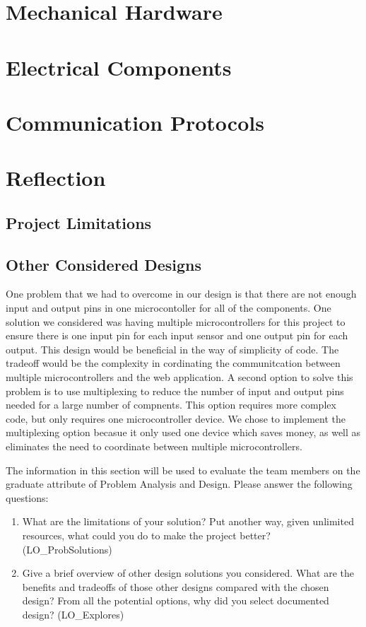 \documentclass[12pt, titlepage]{article}
\begin{document}

\section{Mechanical Hardware}

\section{Electrical Components}

\section{Communication Protocols}

\section{Reflection}

\subsection*{Project Limitations}

\subsection*{Other Considered Designs}
One problem that we had to overcome in our design is that there are not enough input and output pins in one microcontoller for all of the components.
One solution we considered was having multiple microcontrollers for this project to ensure there is one input pin for each input sensor and one output pin for each output.
This design would be beneficial in the way of simplicity of code. The tradeoff would be the complexity in cordinating the communitcation between multiple microcontrollers and the 
web application. A second option to solve this problem is to use multiplexing to reduce the number of input and output pins needed for a large number of compnents. 
This option requires more complex code, but only requires one microcontroller device. We chose to implement the multiplexing option becasue it only used one device which saves money,
as well as eliminates the need to coordinate between multiple microcontrollers. 

The information in this section will be used to evaluate the team members on the
graduate attribute of Problem Analysis and Design.  Please answer the following questions:

\begin{enumerate}
  \item What are the limitations of your solution?  Put another way, given
  unlimited resources, what could you do to make the project better? (LO\_ProbSolutions)
  \item Give a brief overview of other design solutions you considered.  What
  are the benefits and tradeoffs of those other designs compared with the chosen
  design?  From all the potential options, why did you select documented design?
  (LO\_Explores)
\end{enumerate}
\end{document}
